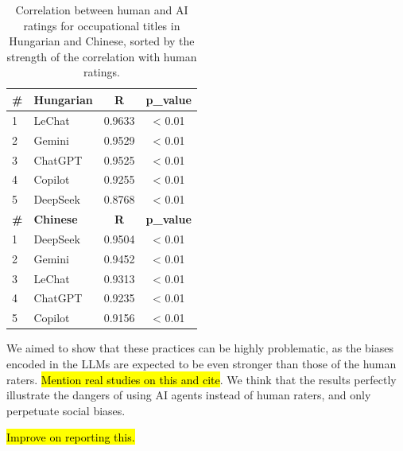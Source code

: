 \documentclass[11pt]{article}
\begin{document}

\begin{table}
  \caption{Correlation between human and AI ratings for occupational titles in Hungarian and Chinese, sorted by the strength of the correlation with human ratings.}
  \centering
  \begin{tabular}{l|l|c|c}
    \textbf{\#} & \textbf{Hungarian} & \textbf{R} & \textbf{p\_value} \\
    \hline
    1 & LeChat & 0.9633 & < 0.01 \\
    2 & Gemini & 0.9529 & < 0.01 \\
    3 & ChatGPT & 0.9525 & < 0.01 \\
    4 & Copilot & 0.9255 & < 0.01 \\
    5 & DeepSeek & 0.8768 & < 0.01 \\

    \textbf{\#} & \textbf{Chinese} & \textbf{R} & \textbf{p\_value} \\
    \hline
    1 & DeepSeek & 0.9504 & < 0.01 \\
    2 & Gemini & 0.9452 & < 0.01 \\
    3 & LeChat & 0.9313 & < 0.01 \\
    4 & ChatGPT & 0.9235 & < 0.01 \\
    5 & Copilot & 0.9156 & < 0.01 \\
  \end{tabular}
\end{table}








We aimed to show that these practices can be highly problematic, as the biases encoded in the LLMs are expected to be even stronger than those of the human raters. \hl{Mention real studies on this and cite}. We think that the results perfectly illustrate the dangers of using AI agents instead of human raters, and only perpetuate social biases.



\hl{Improve on reporting this.}
\end{document}
